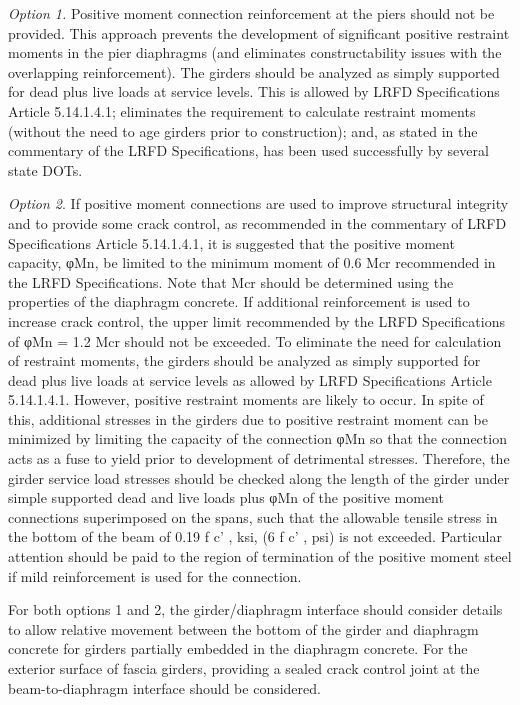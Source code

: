 \emph{Option 1.} Positive moment connection reinforcement at the piers should not be provided. This approach prevents the development of significant positive restraint moments in the pier diaphragms (and eliminates constructability issues with the overlapping reinforcement). The girders should be analyzed as simply supported for dead plus live loads at service levels. This is allowed by LRFD Specifications Article 5.14.1.4.1; eliminates the requirement to calculate restraint moments (without the need to age girders prior to construction); and, as stated in the commentary of the LRFD Specifications, has been used successfully by several state DOTs.

\emph{Option 2}. If positive moment connections are used to improve structural integrity and to provide some crack control, as recommended in the commentary of LRFD Specifications Article 5.14.1.4.1, it is suggested that the positive moment capacity, φMn, be limited to the minimum moment of 0.6 Mcr recommended in the LRFD Specifications. Note that Mcr should be determined using the properties of the diaphragm concrete. If additional reinforcement is used to increase crack control, the upper limit recommended by the LRFD Specifications of φMn = 1.2 Mcr should not be exceeded. To eliminate the need for calculation of restraint moments, the girders should be analyzed as simply supported for dead plus live loads at service levels as allowed by LRFD Specifications Article 5.14.1.4.1. However, positive restraint moments are likely to occur. In spite of this, additional stresses in the girders due to positive restraint moment can be minimized by limiting the capacity of the connection φMn so that the connection acts as a fuse to yield prior to development of detrimental stresses. Therefore, the girder service load stresses should be checked along the length of the girder under simple supported dead and live loads plus φMn of the positive moment connections superimposed on the spans, such that the allowable tensile stress in the bottom of the beam of 0.19 f c' , ksi, (6 f c' , psi) is not exceeded. Particular attention should be paid to the region of termination of the positive moment steel if mild reinforcement is used for the connection.

\bigskip
For both options 1 and 2, the girder/diaphragm interface should consider details to allow relative movement between the bottom of the girder and diaphragm concrete for girders partially embedded in the diaphragm concrete. For the exterior surface of fascia girders, providing a sealed crack control joint at the beam-to-diaphragm interface should be considered.

